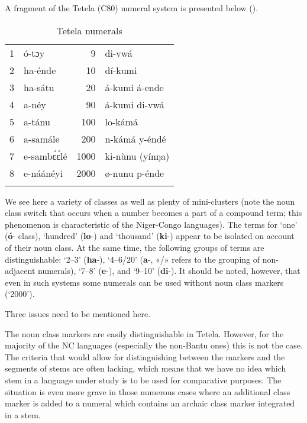 A fragment of the Tetela (C80) numeral system is presented below ().


\begin{table}
\caption{Tetela numerals}
\label{tab:1:1}

\begin{tabularx}{\textwidth}{rXrX}
\lsptoprule

1 & ó-tɔy & 9 & di-vwá\\
2 & ha-{\'{e}}nde & 10 & dí-kumi\\
3 & ha-sátu & 20 & á-kumi á-ende\\
4 & a-n{\'{e}}y & 90 & á-kumi di-vwá\\
5 & a-tánu & 100 & lo-kámá\\
6 & a-samále & 200 & n-kámá y-{\'{e}}nd{\'{e}}\\
7 & e-samb{\'{ɛ}}{\'{ɛ}}l{\'{e}} & 1000 & ki-n{\`{u}}nu (yínŋa)\\
8 & e-náán{\'{e}}yi & 2000 & ø-nunu p-{\'{e}}nde\\
\lspbottomrule
\end{tabularx}
\end{table}

We see here a variety of classes as well as plenty of mini-clusters (note the noun class switch that occurs when a number becomes a part of a compound term; this phenomenon is characteristic of the Niger-Congo languages). The terms for ‘one’ (\textbf{ó}- class), ‘hundred’ (\textbf{lo}-) and ‘thousand’ (\textbf{ki}-) appear to be isolated on account of their noun class. At the same time, the following groups of terms are distinguishable: ‘2--3’ (\textbf{ha}-), ‘4--6/20’ (\textbf{a}-, «/» refers to the grouping of non-adjacent numerals), ‘7--8’ (\textbf{e}-), and ‘9--10’ (\textbf{di}-).  It should be noted, however, that even in such systems some numerals can be used without noun class markers (‘2000’). 

Three issues need to be mentioned here.

The noun class markers are easily distinguishable in Tetela. However, for the majority of the NC languages (especially the non-Bantu ones) this is not the case. The criteria that would allow for distinguishing between the markers and the segments of stems are often lacking, which means that we have no idea which stem in a language under study is to be used for comparative purposes. The situation is even more grave in those numerous cases where an additional class marker is added to a numeral which contains an archaic class marker integrated in a stem.

